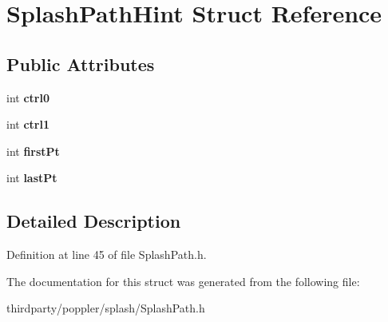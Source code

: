 \hypertarget{struct_splash_path_hint}{}\section{Splash\+Path\+Hint Struct Reference}
\label{struct_splash_path_hint}
\subsection*{Public Attributes}
\begin{DoxyCompactItemize}
\item 
\mbox{\label{struct_splash_path_hint_a49df559f5c610d1fd6f96b99cafab458}} 
int {\bfseries ctrl0}
\item 
\mbox{\label{struct_splash_path_hint_a4116c92cec268a75c227c207f3b6ec72}} 
int {\bfseries ctrl1}
\item 
\mbox{\label{struct_splash_path_hint_a986cf0c3f413e176f27784407ed7abc1}} 
int {\bfseries first\+Pt}
\item 
\mbox{\label{struct_splash_path_hint_a33aa93247ceed1128886fb91be5579ec}} 
int {\bfseries last\+Pt}
\end{DoxyCompactItemize}


\subsection{Detailed Description}


Definition at line 45 of file Splash\+Path.\+h.



The documentation for this struct was generated from the following file\+:\begin{DoxyCompactItemize}
\item 
thirdparty/poppler/splash/Splash\+Path.\+h\end{DoxyCompactItemize}
